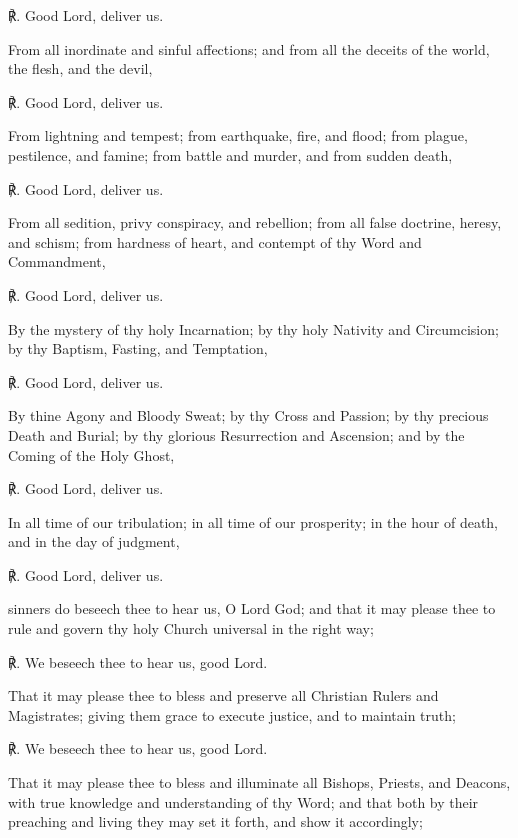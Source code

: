\begin{multicols}{2}
    ℟. Good Lord, deliver us.
    \par\noindent
    From all inordinate and sinful affections; and from all the deceits of the world, the flesh, and the devil,
    
    ℟. Good Lord, deliver us.
    \par\noindent
    From lightning and tempest; from earthquake, fire, and flood; from plague, pestilence, and famine; from battle and murder, and from sudden death,
    
    ℟. Good Lord, deliver us.
    \par\noindent
    From all sedition, privy conspiracy, and rebellion; from all false doctrine, heresy, and schism; from hardness of heart, and contempt of thy Word and Commandment,
    
    ℟. Good Lord, deliver us.
    \par\noindent
    By the mystery of thy holy Incarnation; by thy holy Nativity and Circumcision; by thy Baptism, Fasting, and Temptation,
    
    ℟. Good Lord, deliver us.
    \par\noindent
    By thine Agony and Bloody Sweat; by thy Cross and Passion; by thy precious Death and Burial; by thy glorious Resurrection and Ascension; and by the Coming of the Holy Ghost,
    
    ℟. Good Lord, deliver us.
    \par\noindent
    In all time of our tribulation; in all time of our prosperity; in the hour of death, and in the day of judgment,
    
    ℟. Good Lord, deliver us.
    \par\noindent
     sinners do beseech thee to hear us, O Lord God; and that it may please thee to rule and govern thy holy Church universal in the right way;\par
    ℟. We beseech thee to hear us, good Lord.
    \par\noindent
    That it may please thee to bless and preserve all Christian Rulers and Magistrates; giving them grace to execute justice, and to maintain truth;
    
    ℟. We beseech thee to hear us, good Lord.
    \par\noindent
    That it may please thee to bless and illuminate all Bishops, Priests, and Deacons, with true knowledge and understanding of thy Word; and that both by their preaching and living they may set it forth, and show it accordingly;
    

\end{multicols}

